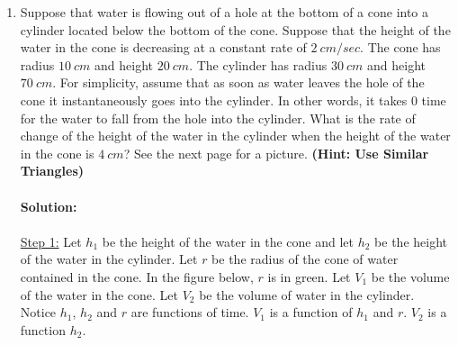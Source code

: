 \documentclass[reqno,psamsfonts]{amsart}
\theoremstyle{definition}
\theoremstyle{remark}
\numberwithin{equation}{section}
\begin{document}
\begin{enumerate}
\item Suppose that water is flowing out of a hole at the bottom of a cone into a cylinder located below the bottom of the cone. Suppose that the height of the water in the cone is decreasing at a constant rate of $2\ cm/sec$. The cone has radius $10\ cm$ and height $20\ cm$. The cylinder has radius $30\ cm$ and height $70\ cm$. For simplicity, assume that as soon as water leaves the hole of the cone it instantaneously goes into the cylinder. In other words, it takes 0 time for the water to fall from the hole into the cylinder. What is the rate of change of the height of the water in the cylinder when the height of the water in the cone is $4\ cm$? See the next page for a picture. \textbf{(Hint: Use Similar Triangles)}
\\
\\\textbf{Solution:}
\\
\\\underline{Step 1:} Let $h_{1}$ be the height of the water in the cone and let $h_{2}$ be the height of the water in the cylinder. Let $r$ be the radius of the cone of water contained in the cone. In the figure below, $r$ is in green. Let $V_{1}$ be the volume of the water in the cone. Let $V_{2}$ be the volume of water in the cylinder. Notice $h_{1}$, $h_{2}$ and $r$ are functions of time. $V_{1}$ is a function of $h_{1}$ and $r$. $V_{2}$ is a function $h_{2}$. 
\begin{center}
\end{center}
\end{enumerate}
\end{document}
